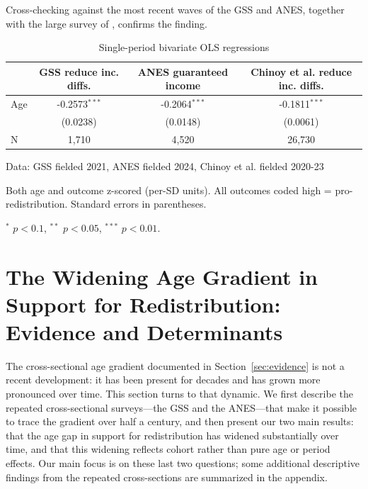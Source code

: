 \documentclass[11pt, headsepline]{article}
\begin{document}
Cross-checking against the most recent waves of the GSS and ANES, together with the large survey of \citet{chinoy2026zero}, confirms the finding.
\begin{table}[H]
\caption{Single-period bivariate OLS regressions}
\centering
\begin{threeparttable}
\begin{tabular}{lccc}
\toprule
 & GSS reduce inc. diffs. & ANES guaranteed income & Chinoy et al. reduce inc. diffs. \\
\midrule
Age & -0.2573$^{***}$ & -0.2064$^{***}$ & -0.1811$^{***}$ \\
    & (0.0238) & (0.0148) & (0.0061) \\
\midrule
N & 1,710 & 4,520 & 26,730 \\
\bottomrule
\end{tabular}
\begin{tablenotes}[flushleft]
\footnotesize
\item Data: GSS fielded 2021, ANES fielded 2024, Chinoy et al. fielded 2020-23
\item Both age and outcome z-scored (per-SD units). All outcomes coded high =
pro-redistribution. Standard errors in parentheses.
\item $^{*}$ $p<0.1$, $^{**}$ $p<0.05$, $^{***}$ $p<0.01$.
\end{tablenotes}
\end{threeparttable}
\end{table}


\newpage
\section{The Widening Age Gradient in Support for Redistribution: Evidence and Determinants}\label{sec:widening}

The cross-sectional age gradient documented in Section~\ref{sec:evidence} is not a recent development: it has been present for decades and has grown more pronounced over time. This section turns to that dynamic. We first describe the repeated cross-sectional surveys---the GSS and the ANES---that make it possible to trace the gradient over half a century, and then present our two main results: that the age gap in support for redistribution has widened substantially over time, and that this widening reflects cohort rather than pure age or period effects. Our main focus is on these last two questions; some additional descriptive findings from the repeated cross-sections are summarized in the appendix.
\end{document}
